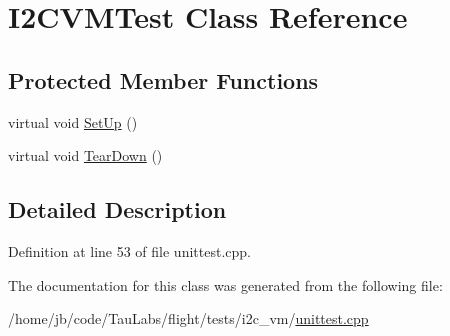\hypertarget{class_i2_c_v_m_test}{\section{\-I2\-C\-V\-M\-Test \-Class \-Reference}
\label{class_i2_c_v_m_test}
}
\subsection*{\-Protected \-Member \-Functions}
\begin{DoxyCompactItemize}
\item 
virtual void \hyperlink{group___unit_tests_ga14dcb45d7859a9c686f96f3ca84013c4}{\-Set\-Up} ()
\item 
virtual void \hyperlink{group___unit_tests_ga7c761569820d4a0ce44dc316e20870e7}{\-Tear\-Down} ()
\end{DoxyCompactItemize}


\subsection{\-Detailed \-Description}


\-Definition at line 53 of file unittest.\-cpp.



\-The documentation for this class was generated from the following file\-:\begin{DoxyCompactItemize}
\item 
/home/jb/code/\-Tau\-Labs/flight/tests/i2c\-\_\-vm/\hyperlink{i2c__vm_2unittest_8cpp}{unittest.\-cpp}\end{DoxyCompactItemize}
